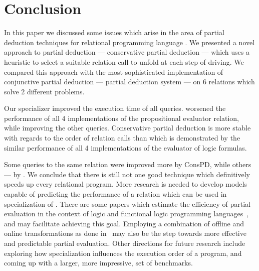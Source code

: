 \section{Conclusion}

In this paper we discussed some issues which arise in the area of partial deduction techniques for relational programming language \mk.
We presented a novel approach to partial deduction --- conservative partial deduction --- which uses a heuristic to select a suitable relation call to unfold at each step of driving.
We compared this approach with the most sophisticated implementation of conjunctive partial deduction --- \ecce partial deduction system --- on 6 relations which solve 2 different problems.

Our specializer improved the execution time of all queries.
\ecce worsened the performance of all 4 implementations of the propositional evaluator relation, while improving the other queries.
Conservative partial deduction is more stable with regards to the order of relation calls than \ecce which is demonstrated by the similar performance of all 4 implementations of the evaluator of logic formulas.

Some queries to the same relation were improved more by ConsPD, while others --- by \ecce.
We conclude that there is still not one good technique which definitively speeds up every relational program.
More research is needed to develop models capable of predicting the performance of a relation which can be used in specialization of \mk.
There are some papers which estimate the efficiency of partial evaluation in the context of logic and functional logic programming languages~\cite{vidal2004cost,vidal2008trace}, and may facilitate achieving this goal.
Employing a combination of offline and online transformations as done in~\cite{hybrid} may also be the step towards more effective and predictable partial evaluation.
Other directions for future research include exploring how specialization influences the execution order of a \mk program, and coming up with a larger, more impressive, set of benchmarks.
